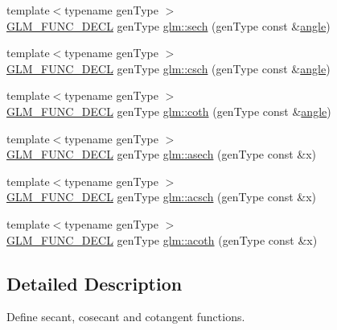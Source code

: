 \begin{DoxyCompactItemize}
{\footnotesize template$<$typename gen\+Type $>$ }\\\hyperlink{setup_8hpp_ab2d052de21a70539923e9bcbf6e83a51}{G\+L\+M\+\_\+\+F\+U\+N\+C\+\_\+\+D\+E\+CL} gen\+Type \hyperlink{group__gtc__reciprocal_gaaa698b992c63f454a3a1a1baa2773a3c}{glm\+::sech} (gen\+Type const \&\hyperlink{group__gtc__quaternion_ga23a3fc7ada5bbb665ff84c92c6e0542c}{angle})
\item 
{\footnotesize template$<$typename gen\+Type $>$ }\\\hyperlink{setup_8hpp_ab2d052de21a70539923e9bcbf6e83a51}{G\+L\+M\+\_\+\+F\+U\+N\+C\+\_\+\+D\+E\+CL} gen\+Type \hyperlink{group__gtc__reciprocal_ga00404a9cdf62023792d1d0afedd7f896}{glm\+::csch} (gen\+Type const \&\hyperlink{group__gtc__quaternion_ga23a3fc7ada5bbb665ff84c92c6e0542c}{angle})
\item 
{\footnotesize template$<$typename gen\+Type $>$ }\\\hyperlink{setup_8hpp_ab2d052de21a70539923e9bcbf6e83a51}{G\+L\+M\+\_\+\+F\+U\+N\+C\+\_\+\+D\+E\+CL} gen\+Type \hyperlink{group__gtc__reciprocal_gae2f1e6f7c360dda452b88e0c492d6f4d}{glm\+::coth} (gen\+Type const \&\hyperlink{group__gtc__quaternion_ga23a3fc7ada5bbb665ff84c92c6e0542c}{angle})
\item 
{\footnotesize template$<$typename gen\+Type $>$ }\\\hyperlink{setup_8hpp_ab2d052de21a70539923e9bcbf6e83a51}{G\+L\+M\+\_\+\+F\+U\+N\+C\+\_\+\+D\+E\+CL} gen\+Type \hyperlink{group__gtc__reciprocal_ga450f3bf1c04751198994d26d92ac2a63}{glm\+::asech} (gen\+Type const \&x)
\item 
{\footnotesize template$<$typename gen\+Type $>$ }\\\hyperlink{setup_8hpp_ab2d052de21a70539923e9bcbf6e83a51}{G\+L\+M\+\_\+\+F\+U\+N\+C\+\_\+\+D\+E\+CL} gen\+Type \hyperlink{group__gtc__reciprocal_ga418b31539e1a69c262712f2c7a4f27eb}{glm\+::acsch} (gen\+Type const \&x)
\item 
{\footnotesize template$<$typename gen\+Type $>$ }\\\hyperlink{setup_8hpp_ab2d052de21a70539923e9bcbf6e83a51}{G\+L\+M\+\_\+\+F\+U\+N\+C\+\_\+\+D\+E\+CL} gen\+Type \hyperlink{group__gtc__reciprocal_gad73911994e6bb6a06cc3ea1bd89201ab}{glm\+::acoth} (gen\+Type const \&x)
\end{DoxyCompactItemize}


\subsection{Detailed Description}
Define secant, cosecant and cotangent functions. 

